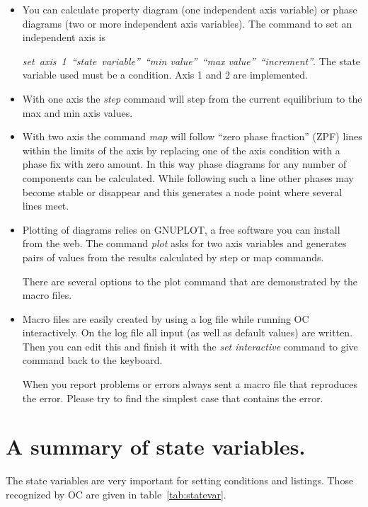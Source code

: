 \documentclass[12pt]{article}
\begin{document}
\begin{itemize}
\item You can calculate property diagram (one independent axis
  variable) or phase diagrams (two or more independent axis variables).
  The command to set an independent axis is 

  {\em set~axis~1~``state~variable''~``min value''~``max
    value''~``increment''}.  The state variable used must be a
  condition.  Axis 1 and 2 are implemented.

\item With one axis the {\em step} command will step from the current
  equilibrium to the max and min axis values.

\item With two axis the command {\em map} will follow ``zero phase
  fraction'' (ZPF) lines within the limits of the axis by replacing
  one of the axis condition with a phase fix with zero amount.  In
  this way phase diagrams for any number of components can be
  calculated.  While following such a line other phases may become
  stable or disappear and this generates a node point where several
  lines meet.

\item Plotting of diagrams relies on GNUPLOT, a free software you can
  install from the web.  The command {\em plot} asks for two axis
  variables and generates pairs of values from the results calculated
  by step or map commands.

  There are several options to the plot command that are demonstrated by
  the macro files.

\item Macro files are easily created by using a log file while running
  OC interactively.  On the log file all input (as well as default
  values) are written.  Then you can edit this and finish it with the
  {\em set interactive} command to give command back to the keyboard.

  When you report problems or errors always sent a macro file that
  reproduces the error.  Please try to find the simplest case that
  contains the error.
\end{itemize}

\section{A summary of state variables.}

The state variables are very important for setting conditions and
listings.  Those recognized by OC are given in
table~\ref{tab:statevar}.
\end{document}

